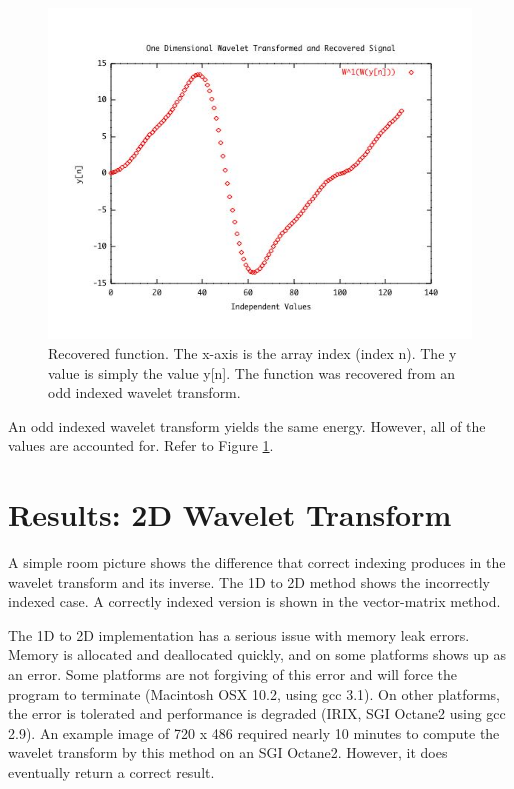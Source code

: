  
\begin{figure}
\begin{center}\includegraphics [width=6in]{recovered.jpg} \end{center}
\caption{Recovered function.  The x-axis is the array index (index n).  The y value is simply the value y[n].  The function was recovered from an odd indexed wavelet transform. }
\label{recoverOdd}
\end{figure}

An odd indexed wavelet transform yields the same energy.  However, all of the values are accounted for.  Refer to Figure \ref{recoverOdd}.  

\section {Results: 2D Wavelet Transform }
A simple room picture shows the difference that correct indexing produces in the wavelet transform and its inverse. The 1D to 2D method shows the incorrectly indexed case.  A correctly indexed version is shown in the vector-matrix method.  

The 1D to 2D implementation has a serious issue with memory leak errors.  Memory is allocated and deallocated quickly, and on some platforms shows up as an error.   Some platforms are not forgiving of this error and will force the program to terminate (Macintosh OSX 10.2, using gcc 3.1).    On other platforms, the error is tolerated and performance is degraded (IRIX, SGI Octane2 using gcc 2.9).   An example image of 720 x 486 required nearly 10 minutes to compute the wavelet transform by this method on an SGI Octane2.  However, it does eventually return a correct result.  


